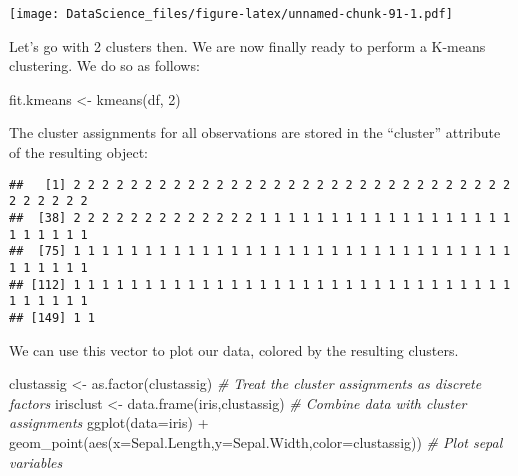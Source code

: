 \documentclass[
]{book}
\newenvironment{Shaded}{\begin{snugshade}}{\end{snugshade}}
\newcommand{\AttributeTok}[1]{\textcolor[rgb]{0.77,0.63,0.00}{#1}}
\newcommand{\CommentTok}[1]{\textcolor[rgb]{0.56,0.35,0.01}{\textit{#1}}}
\newcommand{\DecValTok}[1]{\textcolor[rgb]{0.00,0.00,0.81}{#1}}
\newcommand{\FunctionTok}[1]{\textcolor[rgb]{0.00,0.00,0.00}{#1}}
\newcommand{\NormalTok}[1]{#1}
\newcommand{\OtherTok}[1]{\textcolor[rgb]{0.56,0.35,0.01}{#1}}
\newcommand{\SpecialCharTok}[1]{\textcolor[rgb]{0.00,0.00,0.00}{#1}}
\begin{document}
\texttt{[image: DataScience\_files/figure-latex/unnamed-chunk-91-1.pdf]}

Let's go with 2 clusters then. We are now finally ready to perform a K-means clustering. We do so as follows:

\begin{Shaded}
\begin{Highlighting}[]
\NormalTok{fit.kmeans }\OtherTok{\textless{}{-}} \FunctionTok{kmeans}\NormalTok{(df, }\DecValTok{2}\NormalTok{)}
\end{Highlighting}
\end{Shaded}

The cluster assignments for all observations are stored in the ``cluster'' attribute of the resulting object:

\begin{Shaded}
\end{Shaded}

\begin{verbatim}
##   [1] 2 2 2 2 2 2 2 2 2 2 2 2 2 2 2 2 2 2 2 2 2 2 2 2 2 2 2 2 2 2 2 2 2 2 2 2 2
##  [38] 2 2 2 2 2 2 2 2 2 2 2 2 2 1 1 1 1 1 1 1 1 1 1 1 1 1 1 1 1 1 1 1 1 1 1 1 1
##  [75] 1 1 1 1 1 1 1 1 1 1 1 1 1 1 1 1 1 1 1 1 1 1 1 1 1 1 1 1 1 1 1 1 1 1 1 1 1
## [112] 1 1 1 1 1 1 1 1 1 1 1 1 1 1 1 1 1 1 1 1 1 1 1 1 1 1 1 1 1 1 1 1 1 1 1 1 1
## [149] 1 1
\end{verbatim}

We can use this vector to plot our data, colored by the resulting clusters.

\begin{Shaded}
\begin{Highlighting}[]
\NormalTok{clustassig }\OtherTok{\textless{}{-}} \FunctionTok{as.factor}\NormalTok{(clustassig) }\CommentTok{\# Treat the cluster assignments as discrete factors}
\NormalTok{irisclust }\OtherTok{\textless{}{-}} \FunctionTok{data.frame}\NormalTok{(iris,clustassig) }\CommentTok{\# Combine data with cluster assignments}
\FunctionTok{ggplot}\NormalTok{(}\AttributeTok{data=}\NormalTok{iris) }\SpecialCharTok{+} \FunctionTok{geom\_point}\NormalTok{(}\FunctionTok{aes}\NormalTok{(}\AttributeTok{x=}\NormalTok{Sepal.Length,}\AttributeTok{y=}\NormalTok{Sepal.Width,}\AttributeTok{color=}\NormalTok{clustassig)) }\CommentTok{\# Plot sepal variables}
\end{Highlighting}
\end{Shaded}
\end{document}
